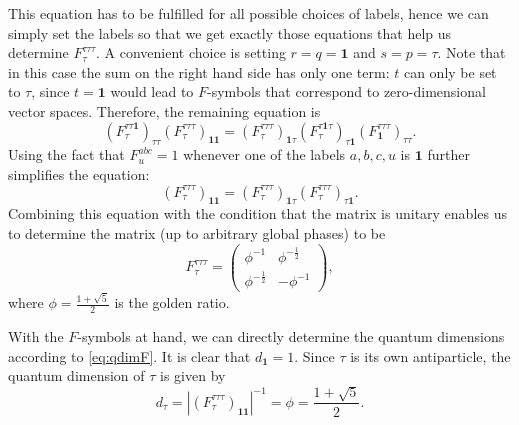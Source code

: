 \begin{exmp}
	This equation has to be fulfilled for all possible choices of labels, hence we can simply set the labels so that we get exactly those equations that help us determine $F_\tau^{\tau\tau\tau}$. A convenient choice is setting $r=q=\mathbf{1}$ and $s=p=\tau$. Note that in this case the sum on the right hand side has only one term: $t$ can only be set to $\tau$, since $t=\mathbf{1}$ would lead to $F$-symbols that correspond to zero-dimensional vector spaces. Therefore, the remaining equation is
		\begin{equation}
			\left(F_\tau^{\tau\tau\mathbf{1}}\right)_{\tau\tau}\left(F_\tau^{\tau\tau\tau}\right)_{\mathbf{1}\mathbf{1}}=\left(F_\tau^{\tau\tau\tau}\right)_{\mathbf{1}\tau}\left(F_\tau^{\tau\mathbf{1}\tau}\right)_{\tau\mathbf{1}}\left(F_\mathbf{1}^{\tau\tau\tau}\right)_{\tau\tau}.
		\end{equation}
	Using the fact that $F_u^{abc}=1$ whenever one of the labels $a,b,c,u$ is $\mathbf{1}$ further simplifies the equation:
		\begin{equation}
			\left(F_\tau^{\tau\tau\tau}\right)_{\mathbf{1}\mathbf{1}}=\left(F_\tau^{\tau\tau\tau}\right)_{\mathbf{1}\tau}\left(F_\tau^{\tau\tau\tau}\right)_{\tau\mathbf{1}}.
		\end{equation}
	Combining this equation with the condition that the matrix is unitary enables us to determine the matrix (up to arbitrary global phases) to be
		\begin{equation}
		\label{eq:Ftau}
			F_\tau^{\tau\tau\tau}=\begin{pmatrix}
				\phi^{-1} & \phi^{-\frac{1}{2}}\\
				\phi^{-\frac{1}{2}} & -\phi^{-1}
			\end{pmatrix},
		\end{equation}
	where $\phi=\frac{1+\sqrt{5}}{2}$ is the golden ratio.

	With the $F$-symbols at hand, we can directly determine the quantum dimensions according to \cref{eq:qdimF}. It is clear that $d_\mathbf{1}=1$. Since $\tau$ is its own antiparticle, the quantum dimension of $\tau$ is given by
		\begin{equation}
			d_\tau=\left|\left(F_\tau^{\tau\tau\tau}\right)_{\mathbf{1}\mathbf{1}}\right|^{-1}=\phi=\frac{1+\sqrt{5}}{2}.
		\end{equation}
	

\end{exmp}
